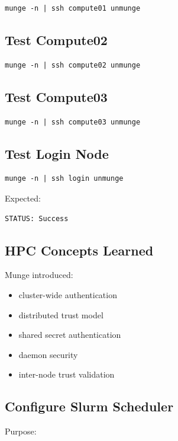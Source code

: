 \documentclass[11pt]{article}
\begin{document}
\begin{verbatim}
munge -n | ssh compute01 unmunge
\end{verbatim}
\subsection{Test Compute02}
\label{sec:orgc88c3fc}

\begin{verbatim}
munge -n | ssh compute02 unmunge
\end{verbatim}
\subsection{Test Compute03}
\label{sec:orgab9ba55}

\begin{verbatim}
munge -n | ssh compute03 unmunge
\end{verbatim}
\subsection{Test Login Node}
\label{sec:org3566f51}

\begin{verbatim}
munge -n | ssh login unmunge
\end{verbatim}

Expected:

\begin{verbatim}
STATUS: Success
\end{verbatim}
\subsection{HPC Concepts Learned}
\label{sec:org9b3371f}

Munge introduced:

\begin{itemize}
\item cluster-wide authentication
\item distributed trust model
\item shared secret authentication
\item daemon security
\item inter-node trust validation
\end{itemize}
\subsection{Configure Slurm Scheduler}
\label{sec:org0b7c735}

Purpose:
\end{document}
